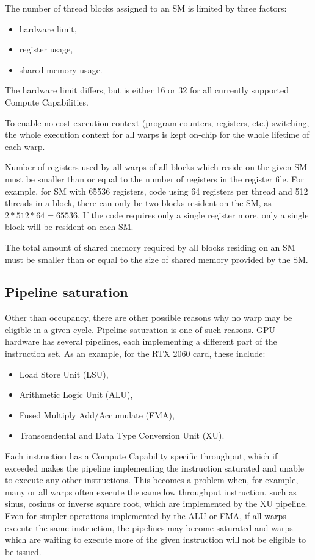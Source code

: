 The number of thread blocks assigned to an SM is limited by three factors:

\begin{itemize}
	\item hardware limit,
	\item register usage,
	\item shared memory usage.
\end{itemize}

The hardware limit differs, but is either 16 or 32 for all currently supported Compute Capabilities. 

To enable no cost execution context (program counters, registers, etc.) switching, the whole execution context for all warps is kept on-chip for the whole lifetime of each warp. 


Number of registers used by all warps of all blocks which reside on the given SM must be smaller than or equal to the number of registers in the register file. For example, for SM with 65536 registers, code using 64 registers per thread and 512 threads in a block, there can only be two blocks resident on the SM, as $2*512*64 = 65536$. If the code requires only a single register more, only a single block will be resident on each SM.

The total amount of shared memory required by all blocks residing on an SM must be smaller than or equal to the size of shared memory provided by the SM. 

\subsection{Pipeline saturation}

Other than occupancy, there are other possible reasons why no warp may be eligible in a given cycle. Pipeline saturation is one of such reasons. GPU hardware has several pipelines, each implementing a different part of the instruction set. As an example, for the RTX 2060 card, these include:
\begin{itemize}
	\item Load Store Unit (LSU),
	\item Arithmetic Logic Unit (ALU),
	\item Fused Multiply Add/Accumulate (FMA),
	\item Transcendental and Data Type Conversion Unit (XU).
\end{itemize}

Each instruction has a Compute Capability specific throughput, which if exceeded makes the pipeline implementing the instruction saturated and unable to execute any other instructions. This becomes a problem when, for example, many or all warps often execute the same low throughput instruction, such as sinus, cosinus or inverse square root, which are implemented by the XU pipeline. Even for simpler operations implemented by the ALU or FMA, if all warps execute the same instruction, the pipelines may become saturated and warps which are waiting to execute more of the given instruction will not be eligible to be issued.

